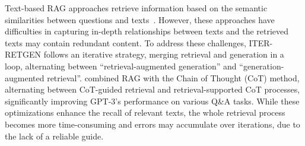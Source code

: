 \documentclass{article} %
\begin{document}
Text-based RAG approaches retrieve information based on the semantic similarities between questions and texts~\citep{gao2024retrievalaugmentedgenerationlargelanguage,qiu2024entropybaseddecodingretrievalaugmentedlarge}. However, these approaches have difficulties in capturing in-depth relationships between texts and the retrieved texts may contain redundant content.
To address these challenges, 
ITER-RETGEN \citep{shao2023enhancingretrievalaugmentedlargelanguage} follows an iterative strategy, merging retrieval and generation in a loop, alternating between ``retrieval-augmented generation'' and ``generation-augmented retrieval''. \citet{trivedi2023interleavingretrievalchainofthoughtreasoning} combined RAG with the Chain of Thought (CoT) \citep{DBLP:journals/corr/abs-2201-11903} method, alternating between CoT-guided retrieval and retrieval-supported CoT processes, significantly improving GPT-3's performance on various Q\&A tasks. While these optimizations enhance the recall of relevant texts, the whole retrieval process becomes more time-consuming and errors may accumulate over iterations, due to the lack of a reliable guide.

 
\end{document}
